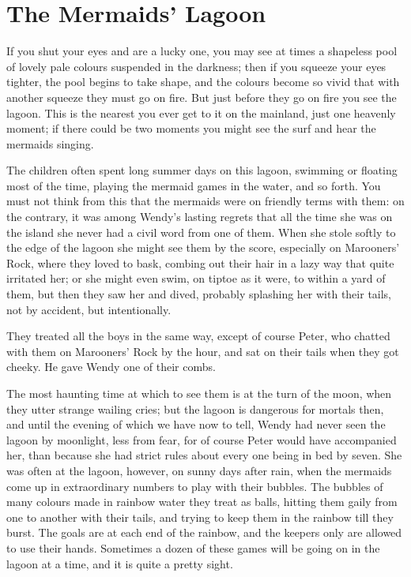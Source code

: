 
\chapter{The Mermaids’ Lagoon}

If you shut your eyes and are a lucky one,
you may see at times a shapeless pool of lovely pale colours suspended in the darkness;
then if you squeeze your eyes tighter, the pool begins to take shape,
and the colours become so vivid that with another squeeze they must go on fire.
But just before they go on fire you see the lagoon.
This is the nearest you ever get to it on the mainland, just one heavenly moment;
if there could be two moments you might see the surf and hear the mermaids singing.

The children often spent long summer days on this lagoon,
swimming or floating most of the time, playing the mermaid games in the water, and so forth.
You must not think from this that the mermaids were on friendly terms with them:
on the contrary, it was among Wendy's lasting regrets
that all the time she was on the island she never had a civil word from one of them.
When she stole softly to the edge of the lagoon she might see them by the score,
especially on Marooners' Rock, where they loved to bask,
combing out their hair in a lazy way that quite irritated her;
or she might even swim, on tiptoe as it were, to within a yard of them,
but then they saw her and dived, probably splashing her with their tails,
not by accident, but intentionally.

They treated all the boys in the same way, except of course Peter,
who chatted with them on Marooners' Rock by the hour,
and sat on their tails when they got cheeky.
He gave Wendy one of their combs.

The most haunting time at which to see them is at the turn of the moon,
when they utter strange wailing cries;
but the lagoon is dangerous for mortals then,
and until the evening of which we have now to tell, Wendy had never seen the lagoon by moonlight,
less from fear, for of course Peter would have accompanied her,
than because she had strict rules about every one being in bed by seven.
She was often at the lagoon, however, on sunny days after rain,
when the mermaids come up in extraordinary numbers to play with their bubbles.
The bubbles of many colours made in rainbow water they treat as balls,
hitting them gaily from one to another with their tails, and trying to keep them in the rainbow till they burst.
The goals are at each end of the rainbow, and the keepers only are allowed to use their hands.
Sometimes a dozen of these games will be going on in the lagoon at a time, and it is quite a pretty sight.

